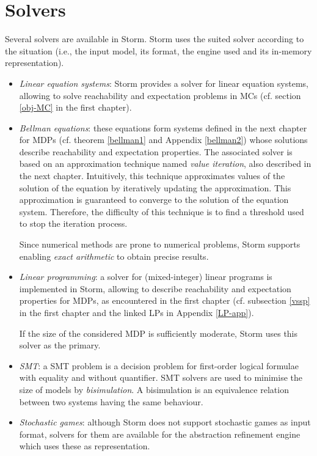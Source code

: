 \section{Solvers}
Several solvers are available in Storm.
Storm uses the suited solver according to the situation (i.e., the input model, its format, the engine used and its in-memory representation).

\begin{itemize}
  \item \textit{Linear equation systems}: Storm provides a
    solver for linear equation systems, allowing to solve reachability and expectation problems in MCs (cf. section \ref{obj-MC} in the first chapter).
  \item \textit{Bellman equations}: these equations form
    systems defined in the next chapter for MDPs (cf. theorem
    \ref{bellman1} and Appendix \ref{bellman2}) whose solutions describe
    reachability and expectation properties.
    The associated solver is based on an approximation technique named \textit{value iteration}, also described in the next chapter.
    Intuitively, this technique approximates values of the solution of the equation by iteratively updating the approximation. This approximation is guaranteed to converge to the solution of the equation system.
    Therefore, the difficulty of this technique is to find a threshold used to stop the iteration process.
    \par Since numerical methods are prone to numerical problems, Storm supports enabling \textit{exact arithmetic} to obtain precise results.
  \item \textit{Linear programming}: a solver for (mixed-integer) linear programs is implemented in Storm, allowing to describe reachability and expectation properties for MDPs, as encountered in the first chapter (cf. subsection \ref{vssp} in the first chapter and the linked LPs in Appendix \ref{LP-app}).\par
  If the size of the considered MDP is sufficiently moderate, Storm uses this solver as the primary.
  \item \textit{SMT}: a SMT problem is a decision problem for first-order logical formulae with equality and without quantifier. SMT solvers are used to minimise the size of models by \textit{bisimulation}.
  A bisimulation is an equivalence relation between two systems having the same behaviour.
  \item \textit{Stochastic games}: although Storm does not support stochastic games as input format,
    solvers for them are available for the abstraction refinement engine
    which uses these as representation.
\end{itemize}
